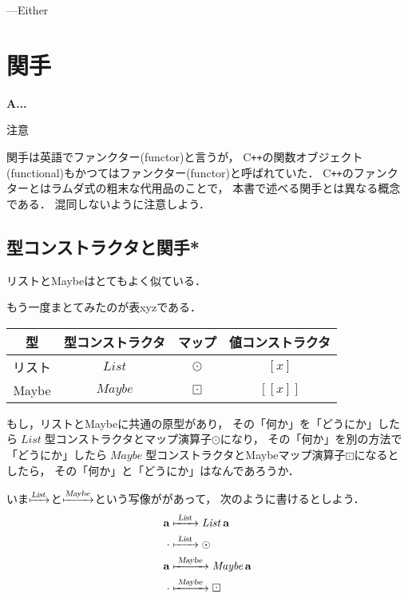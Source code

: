 \documentclass[a5paper,draft]{jsbook}
\def\[{\left[\!\left[}
\def\]{\right]\!\right]}
\newcommand{\programminglanguage}[1]{\textsf{#1}}
\newcommand{\cxx}{\programminglanguage{C}\texttt{++}}
\newenvironment{leader}{\begingroup\bf}{\endgroup}
\newenvironment{caution}{\begin{boxnote}\begin{center}注意\end{center}}{\end{boxnote}}
\newcommand{\mathTypeParameter}[1]{\mathbf{#1}}
\newcommand{\mathFunctor}[1]{\textsl{#1}} %
\newcommand{\mathTypeConstructor}[1]{\mathit{#1}} %
\newcommand{\mathListWith}[1]{\left[#1\right]}
\newcommand{\mathMaybeWith}[1]{\[#1\]}
\newcommand{\mathPureWith}[1]{\left\langle#1\right\rangle}
\DeclareMathOperator{\mathList}{\mathTypeConstructor{List}}
\DeclareMathOperator{\mathMaybe}{\mathTypeConstructor{Maybe}}
\DeclareMathOperator{\mathListFunctor}{\mathFunctor{List}}
\DeclareMathOperator{\mathMaybeFunctor}{\mathFunctor{Maybe}}
\newcommand{\mathGeneralMap}{\mathbin{\cdot}}
\newcommand{\mathMap}{\mathbin{\odot}}
\newcommand{\mathMaybeMap}{\mathbin{\boxdot}}
\begin{document}
---Either

\chapter{関手}
\label{ch:functor}

\begin{leader}
A...
\end{leader}

\begin{caution}
関手は英語でファンクター(functor)と言うが，
\cxx の関数オブジェクト(functional)もかつてはファンクター(functor)と呼ばれていた．
\cxx のファンクターとはラムダ式の粗末な代用品のことで，
本書で述べる関手とは異なる概念である．
混同しないように注意しよう．
\end{caution}


\section{型コンストラクタと関手*}

リストとMaybeはとてもよく似ている．

もう一度まとてみたのが表xyzである．

\begin{table}
\begin{center}
\begin{tabular}{||c|c|c|c||}\hline
型&型コンストラクタ&マップ&値コンストラクタ\\\hline\hline
リスト&$\mathList$&$\mathMap$&$\mathListWith{x}$\\
Maybe&$\mathMaybe$&$\mathMaybeMap$&$\mathMaybeWith{x}$\\\hline
\end{tabular}
\end{center}
\end{table}

もし，リストとMaybeに共通の原型があり，
その「何か」を「どうにか」したら$\mathList$型コンストラクタとマップ演算子$\mathMap$になり，
その「何か」を別の方法で「どうにか」したら$\mathMaybe$型コンストラクタとMaybeマップ演算子$\mathMaybeMap$になるとしたら，
その「何か」と「どうにか」はなんであろうか．

いま$\xmapsto{\mathListFunctor}$と$\xmapsto{\mathMaybeFunctor}$という写像ががあって，
次のように書けるとしよう．
\begin{align}
\mathTypeParameter{a}&\xmapsto{\;\mathListFunctor\;}\mathList\mathTypeParameter{a}\\
\mathGeneralMap&\xmapsto{\;\mathListFunctor\;}\mathMap\\
\mathTypeParameter{a}&\xmapsto{\;\mathMaybeFunctor\;}\mathMaybe\mathTypeParameter{a}\\
\mathGeneralMap&\xmapsto{\;\mathMaybeFunctor\;}\mathMaybeMap
\end{align}
\end{document}
